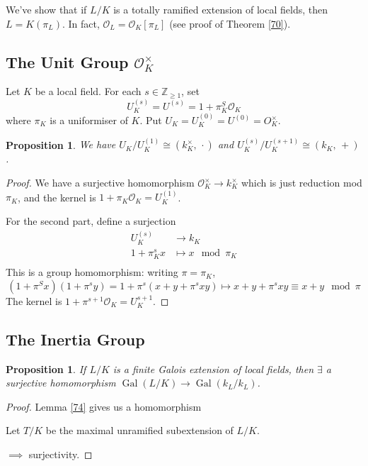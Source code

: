 \documentclass[a4paper]{article}
\newtheorem{prop}[definition]{Proposition}
\DeclareMathOperator{\Aut}{Aut}
\DeclareMathOperator{\Gal}{Gal}
\begin{document}
We've show that if $L/K$ is a totally ramified extension of local fields, then $L=K(\pi_L)$.
In fact, $\mathcal{O}_L = \mathcal{O}_K[\pi_L]$ (see proof of Theorem \ref{70}).

\subsection{The Unit Group $\mathcal{O}_K^\times$}
Let $K$ be a local field.
For each $s \in \mathbb{Z}_{\geq 1}$, set
$$U_K^{(s)} = U^{(s)} = 1 + \pi_K^S \mathcal{O}_K$$
where $\pi_K$ is a uniformiser of $K$.
Put $U_K = U_K^{(0)} = U^{(0)} = O_K^\times$.

\begin{prop}
	We have $U_K/U_K^{(1)} \cong (k_K^\times,\, \cdot)$
	and $U_K^{(s)}/U_K^{(s+1)} \cong (k_K,\, +)$.
\end{prop}
\begin{proof}
	We have a surjective homomorphism $\mathcal{O}_K^\times \to k_K^\times$ which is just reduction mod $\pi_K$,
	and the kernel is $1 + \pi_K\mathcal{O}_K = U_K^{(1)}$.
	
	For the second part, define a surjection
	\begin{align*}
		U_K^{(s)} &\to k_K \\
		1 + \pi_K^sx &\mapsto x \mod \pi_K \\
	\end{align*}
	This is a group homomorphism: writing $\pi = \pi_K$,
	$$(1 + \pi^Sx)(1+\pi^sy) = 1+\pi^s(x + y + \pi^sxy) \mapsto x+y+\pi^sxy \equiv x+y \mod \pi$$
	The kernel is $1+\pi^{s+1}\mathcal{O}_K = U_K^{s+1}$.
\end{proof}

\subsection{The Inertia Group}
\begin{prop}
	If $L/K$ is a finite Galois extension of local fields,
	then $\exists$ a surjective homomorphism $\Gal(L/K) \to \Gal(k_L/k_L)$.
	\label{80}
\end{prop}
\begin{proof}
	Lemma \ref{74} gives us a homomorphism
	\begin{center}
	\end{center}
	
	Let $T/K$ be the maximal unramified subextension of $L/K$.
	\begin{center}
	\end{center}
	
	$\implies$ surjectivity.
\end{proof}
\end{document}
